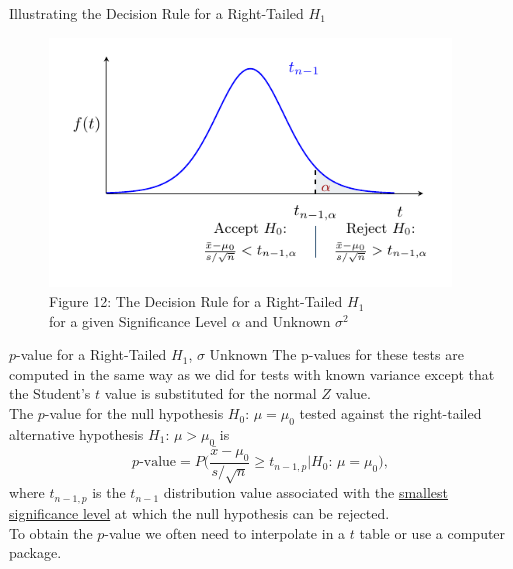 \documentclass[pdf]{beamer}
\theoremstyle{remark}
\theoremstyle{definition}
\begin{document}
\begin{frame}[t]{Illustrating the Decision Rule for a Right-Tailed $H_1$ }
\begin{figure}[htbp]
    \centering
    \captionsetup{justification=centering}
    \includegraphics[clip, trim=0.5cm 0.5cm 0.0cm 0cm, width=0.95\textwidth]{Hypothesis_Testing_Module_9_t1.pdf}  
    \caption{Figure {\color{franklinblue} 12}: The Decision Rule for a Right-Tailed $H_1$ \\ for a given Significance Level $\alpha$ and Unknown $\sigma^2$}
    \label{fig:gauss4}
\end{figure}
\end{frame}

\begin{frame}[t]{$p$-value for a Right-Tailed $H_1$, $\sigma$ Unknown}
The p-values for these tests are computed in the same way as we did for tests with known variance except that the Student's $t$ value is substituted for the normal $Z$ value. \\
\vspace{1.5ex}
The $p$-value for the null hypothesis $H_0\text{: }  \mu = \mu_0$ tested against the right-tailed alternative hypothesis $H_1\text{: }  \mu > \mu_0$ is \\
\vspace{1.5ex}
\begin{equation}
p\text{-value} = P\bigg( \frac{\bar{x} - \mu_0}{s/ \sqrt{n}} \geq t_{n-1,p} | H_0\text{: }  \mu = \mu_0 \bigg),
\end{equation}
where $t_{n-1,p}$ is the $t_{n-1}$ distribution value associated with the \underline{smallest significance level} at which the null hypothesis can be rejected. \\
\vspace{1.5ex}
To obtain the $p$-value we often need to interpolate in a $t$ table or use a computer package.
\end{frame}
\end{document}
